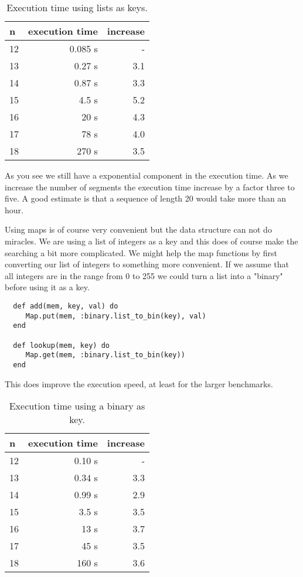 \documentclass[a4paper,11pt]{article}
\begin{document}
\begin{table}[h!]
  \begin{center}
    \begin{tabular}{l|r|r}
      \textbf{n} & \textbf{execution time} & \textbf{increase}\\
      \hline
12	 &0.085 s& - \\ 
13	 &0.27 s&3.1 \\ 
14	 &0.87 s&3.3 \\ 
15	 &4.5 s&5.2 \\ 
16	 &20 s&4.3 \\ 
17	 &78 s&4.0 \\ 
18	 &270 s &3.5 \\ 
    \end{tabular}
    \caption{Execution time using lists as keys.}
  \end{center}
\end{table}

As you see we still have a exponential component in the execution
time. As we increase the number of segments the execution time
increase by a factor three to five. A good estimate is that a
sequence of length 20 would take more than an hour.

Using maps is of course very convenient but the data structure can not
do miracles. We are using a list of integers as a key and this does of
course make the searching a bit more complicated. We might help the
map functions by first converting our list of integers to something
more convenient. If we assume that all integers are in the range from
0 to 255 we could turn a list into a "binary" before using it as a
key.

\begin{verbatim}
  def add(mem, key, val) do 
     Map.put(mem, :binary.list_to_bin(key), val) 
  end  

  def lookup(mem, key) do 
     Map.get(mem, :binary.list_to_bin(key)) 
  end
\end{verbatim}

\noindent This does improve the execution speed, at least for the larger benchmarks. 

\begin{table}[h!]
  \begin{center}
    \begin{tabular}{l|r|r}
      \textbf{n} & \textbf{execution time} & \textbf{increase}\\
      \hline
      12	 &0.10 s&-\\ 
      13	 &0.34 s&3.3 \\ 
      14	 &0.99 s&2.9 \\ 
      15	 &3.5 s &3.5 \\ 
      16	 &13 s &3.7 \\ 
      17	 &45 s &3.5 \\ 
      18	 &160 s &3.6 \\ 
    \end{tabular}
    \caption{Execution time using a binary as key.}
  \end{center}
\end{table}
\end{document}

